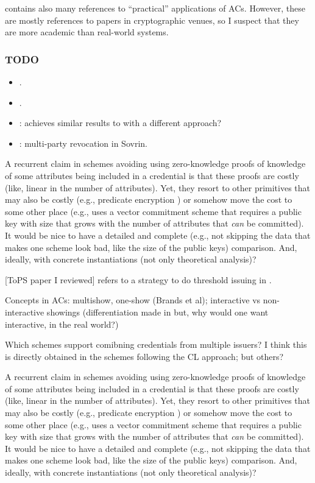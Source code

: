 \cite{hs21} contains also many references to ``practical'' applications of
ACs. However, these are mostly references to papers in cryptographic venues,
so I suspect that they are more academic than real-world systems.

\subsubsection{TODO}

\begin{itemize}
\item \cite{bckl08}.
\item \cite{sand20}.
\item \cite{kkl+16}: achieves similar results to \cite{cgm16} with a different approach?
\item \cite{hkrw21}: multi-party revocation in Sovrin.
\end{itemize}

A recurrent claim in schemes avoiding using zero-knowledge proofs of knowledge
of some attributes being included in a credential is that these proofs are costly
(like, linear in the number of attributes). Yet, they resort to other primitives
that may also be costly (e.g., predicate encryption \cite{dmm+18}) or somehow move
the cost to some other place (e.g., \cite{fhs19} uses a vector commitment scheme
that requires a public key with size that grows with the number of attributes
that \emph{can} be committed). It would be nice to have a detailed and complete
(e.g., not skipping the data that makes one scheme look bad, like the size of
the public keys) comparison. And, ideally, with concrete instantiations (not only
theoretical analysis)?

[ToPS paper I reviewed] refers to a strategy to do threshold issuing in \cite{bbh06}.

Concepts in ACs: multishow, one-show (Brands et al); interactive vs non-interactive
showings (differentiation made in \cite[p.6]{fhs19} but, why would one want interactive,
in the real world?)

Which schemes support comibning credentials from multiple issuers? I think this
is directly obtained in the schemes following the CL approach; but others?

A recurrent claim in schemes avoiding using zero-knowledge proofs of knowledge
of some attributes being included in a credential is that these proofs are costly
(like, linear in the number of attributes). Yet, they resort to other primitives
that may also be costly (e.g., predicate encryption \cite{dmm+18}) or somehow move
the cost to some other place (e.g., \cite{fhs19} uses a vector commitment scheme
that requires a public key with size that grows with the number of attributes
that \emph{can} be committed). It would be nice to have a detailed and complete
(e.g., not skipping the data that makes one scheme look bad, like the size of
the public keys) comparison. And, ideally, with concrete instantiations (not only
theoretical analysis)?

